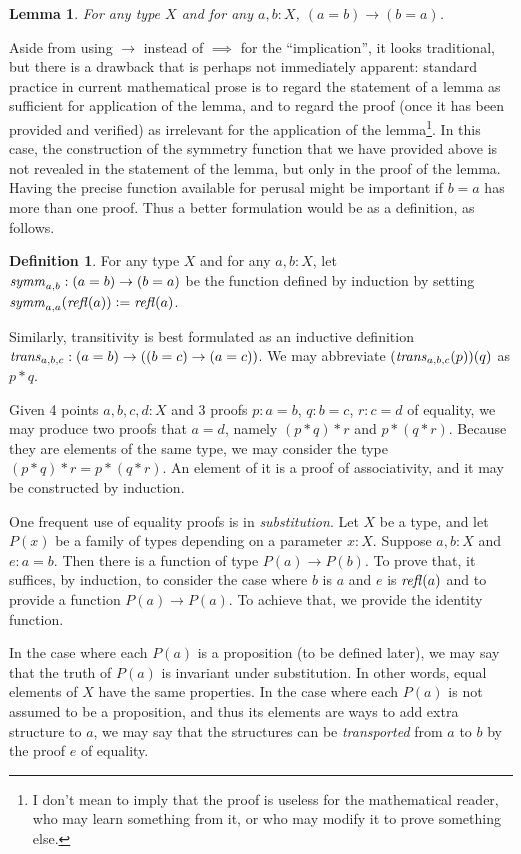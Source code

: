 \documentclass[letter,12pt]{amsart}
\newtheorem{lemma}[theorem]{Lemma}
\theoremstyle{definition}
\newtheorem{definition}[theorem]{Definition}
\theoremstyle{remark}
\numberwithin{equation}{section}
\newcommand{\refl}{\mathop{{\it refl}}}
\newcommand{\symm}{\mathop{{\it symm}}}
\newcommand{\trans}{\mathop{{\it trans}}}
\newcommand{\defeq}{\vcentcolon=}
\begin{document}
\begin{lemma}
  For any type $X$ and for any $a,b:X$, $(a=b) \to (b=a)$.
\end{lemma}

Aside from using $\to$ instead of $\implies$ for the ``implication'', it looks traditional, but there is a drawback that is perhaps not
immediately apparent: standard practice in current mathematical prose is to regard the statement of a lemma as sufficient for application of the
lemma, and to regard the proof (once it has been provided and verified) as irrelevant for the application of the lemma\footnote{I don't mean to
  imply that the proof is useless for the mathematical reader, who may learn something from it, or who may modify it to prove something else.}.
In this case, the construction of the symmetry function that we have provided above is not revealed in the statement of the lemma, but only in
the proof of the lemma.  Having the precise function available for perusal might be important if $b=a$ has more than one proof.  Thus a better
formulation would be as a definition, as follows.

\begin{definition}
  For any type $X$ and for any $a,b:X$, let $\symm_{a,b} : (a=b) \to (b=a)$ be the function defined by induction by setting 
  $\symm_{a,a}(\refl(a)) \defeq \refl(a)$.
\end{definition}

Similarly, transitivity is best formulated as an inductive definition $\trans_{a,b,c} : (a=b) \to ((b=c) \to (a=c))$.  We may abbreviate
$(\trans_{a,b,c}(p))(q)$ as $p*q$.

Given 4 points $a,b,c,d:X$ and 3 proofs $p:a=b$, $q:b=c$, $r:c=d$ of equality, we may produce two proofs that $a=d$, namely $(p*q)*r$ and
$p*(q*r)$.  Because they are elements of the same type, we may consider the type $(p*q)*r = p*(q*r)$.  An element of it is a proof of
associativity, and it may be constructed by induction.

One frequent use of equality proofs is in {\em substitution}.  Let $X$ be a type, and let $P(x)$ be a family of types depending on a parameter
$x:X$.  Suppose $a,b:X$ and $e:a=b$.  Then there is a function of type $P(a) \to P(b)$.  To prove that, it suffices, by induction, to consider
the case where $b$ is $a$ and $e$ is $\refl(a)$ and to provide a function $P(a) \to P(a)$.  To achieve that, we provide the identity function.

In the case where each $P(a)$ is a proposition (to be defined later), we may say that the truth of $P(a)$ is invariant under substitution.  In
other words, equal elements of $X$ have the same properties.  In the case where each $P(a)$ is not assumed to be a proposition, and thus its
elements are ways to add extra structure to $a$, we may say that the structures can be {\em transported} from $a$ to $b$ by the proof $e$ of
equality.
\end{document}
